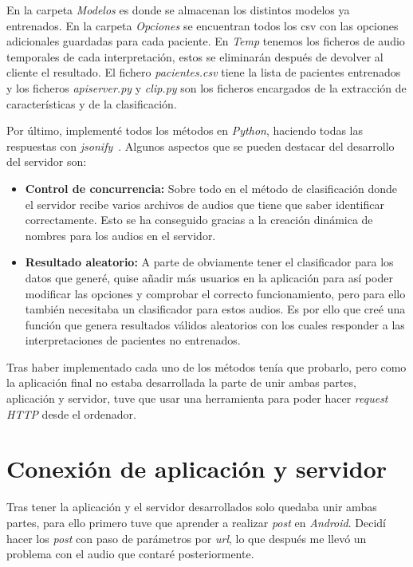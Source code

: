 
En la carpeta \textit{Modelos} es donde se almacenan los distintos modelos ya entrenados. En la carpeta \textit{Opciones} se encuentran todos los csv con las opciones adicionales guardadas para cada paciente. En \textit{Temp} tenemos los ficheros de audio temporales de cada interpretación, estos se eliminarán después de devolver al cliente el resultado. El fichero \textit{pacientes.csv} tiene la lista de pacientes entrenados y los ficheros \textit{apiserver.py} y \textit{clip.py} son los ficheros encargados de la extracción de características y de la clasificación.

Por último, implementé todos los métodos en \textit{Python}, haciendo todas las respuestas con \textit{jsonify}~\cite{jsonify}. Algunos aspectos que se pueden destacar del desarrollo del servidor son:
\begin{itemize}
	\item \textbf{Control de concurrencia:} Sobre todo en el método de clasificación donde el servidor recibe varios archivos de audios que tiene que saber identificar correctamente. Esto se ha conseguido gracias a la creación dinámica de nombres para los audios en el servidor.
	\item \textbf{Resultado aleatorio:} A parte de obviamente tener el clasificador para los datos que generé, quise añadir más usuarios en la aplicación para así poder modificar las opciones y comprobar el correcto funcionamiento, pero para ello también necesitaba un clasificador para estos audios. Es por ello que creé una función que genera resultados válidos aleatorios con los cuales responder a las interpretaciones de pacientes no entrenados.
\end{itemize}

Tras haber implementado cada uno de los métodos tenía que probarlo, pero como la aplicación final no estaba desarrollada la parte de unir ambas partes, aplicación y servidor, tuve que usar una herramienta para poder hacer \textit{request HTTP} desde el ordenador.

\section{Conexión de aplicación y servidor}
Tras tener la aplicación y el servidor desarrollados solo quedaba unir ambas partes, para ello primero tuve que aprender a realizar \textit{post} en \textit{Android}. Decidí hacer los \textit{post} con paso de parámetros por \textit{url}, lo que después me llevó un problema con el audio que contaré posteriormente.

